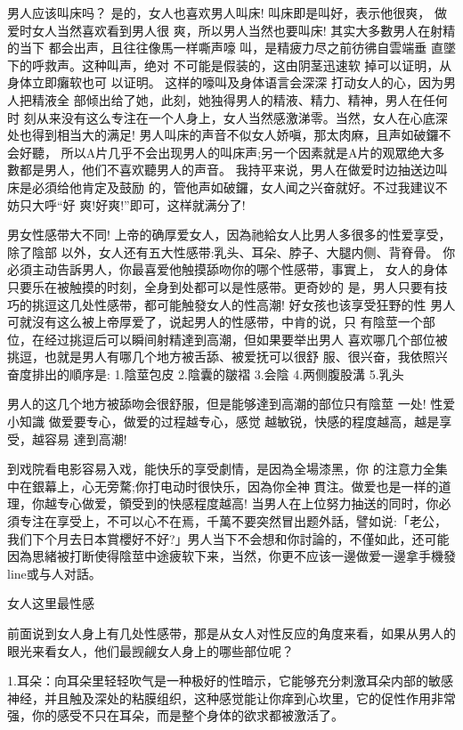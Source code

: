 \documentclass[12pt,UTF8]{ctexbook}
\begin{document}
男人应该叫床吗？
是的，女人也喜欢男人叫床!
叫床即是叫好，表示他很爽，
做爱时女人当然喜欢看到男人很
爽，所以男人当然也要叫床!
其实大多數男人在射精的当下
都会出声，且往往像馬一样嘶声嚎
叫，是精疲力尽之前彷彿自雲端垂
直墜下的呼救声。这种叫声，绝对
不可能是假装的，这由阴茎迅速软
掉可以证明，从身体立即癱软也可
以证明。
这样的嚎叫及身体语言会深深
打动女人的心，因为男人把精液全
部倾出给了她，此刻，她独得男人的精液、精力、精神，男人在任何时
刻从来没有这么专注在一个人身上，女人当然感激涕零。当然，女人在心底深处也得到相当大的满足!
男人叫床的声音不似女人娇嗔，那太肉麻，且声如破鑼不会好聽，
所以A片几乎不会出现男人的叫床声;另一个因素就是A片的观眾绝大多
數都是男人，他们不喜欢聽男人的声音。
我持平来说，男人在做爱时边抽送边叫床是必須给他肯定及鼓励
的，管他声如破鑼，女人闻之兴奋就好。不过我建议不妨只大呼“好
爽!好爽!”即可，这样就满分了!

男女性感带大不同!
上帝的确厚爱女人，因為祂給女人比男人多很多的性爱享受，除了陰部
以外，女人还有五大性感带:乳头、耳朵、脖子、大腿内侧、背脊骨。
你必須主动告訴男人，你最喜爱他触摸舔吻你的哪个性感带，事實上，
女人的身体只要乐在被触摸的时刻，全身到处都可以是性感带。更奇妙的
是，男人只要有技巧的挑逗这几处性感带，都可能触發女人的性高潮!
好女孩也该享受狂野的性
男人可就沒有这么被上帝厚爱了，说起男人的性感带，中肯的说，只
有陰莖一个部位，在经过挑逗后可以瞬间射精達到高潮，但如果要举出男人
喜欢哪几个部位被挑逗，也就是男人有哪几个地方被舌舔、被爱抚可以很舒
服、很兴奋，我依照兴奋度排出的順序是:
1.陰莖包皮
2.陰囊的皺褶
3.会陰
4.两侧腹股溝
5.乳头

男人的这几个地方被舔吻会很舒服，但是能够達到高潮的部位只有陰莖
一处!
性爱小知識
做爱要专心，做爱的过程越专心，感觉
越敏锐，快感的程度越高，越是享受，越容易
達到高潮!

到戏院看电影容易入戏，能快乐的享受劇情，是因為全場漆黑，你
的注意力全集中在銀幕上，心无旁騖;你打电动时很快乐，因為你全神
貫注。做爱也是一样的道理，你越专心做爱，領受到的快感程度越高!
当男人在上位努力抽送的同时，你必須专注在享受上，不可以心不在焉，千萬不要突然冒出题外話，譬如说:「老公，我们下个月去日本賞櫻好不好?」男人当下不会想和你討論的，不僅如此，还可能因為思緒被打断使得陰莖中途疲软下来，当然，你更不应该一邊做爱一邊拿手機發line或与人对話。

女人这里最性感

前面说到女人身上有几处性感带，那是从女人对性反应的角度来看，如果从男人的眼光来看女人，他们最觊觎女人身上的哪些部位呢？

1.耳朵：向耳朵里轻轻吹气是一种极好的性暗示，它能够充分刺激耳朵内部的敏感神经，并且触及深处的粘膜组织，这种感觉能让你痒到心坎里，它的促性作用非常强，你的感受不只在耳朵，而是整个身体的欲求都被激活了。
\end{document}
